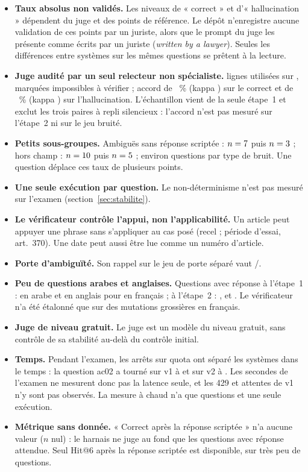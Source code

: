 \begin{itemize}
  \item \textbf{Taux absolus non validés.} Les niveaux de « correct » et d'« hallucination » dépendent du juge et des points de référence.
        Le dépôt n'enregistre aucune validation de ces points par un juriste, alors que le prompt du juge les présente comme écrits par
        un juriste (\emph{written by a lawyer}). Seules les différences entre systèmes sur les mêmes questions se prêtent à la lecture.
  \item \textbf{Juge audité par un seul relecteur non spécialiste.} \EvAuditUsed{} lignes utilisées sur \EvAuditRows, \EvAuditCannot{} marquées
        impossibles à vérifier ; accord de \EvAuditCorrectAgree~\% (kappa \EvAuditCorrectKappa) sur le correct et de \EvAuditHallucAgree~\% (kappa
        \EvAuditHallucKappa) sur l'hallucination. L'échantillon vient de la seule étape~1 et exclut les trois paires à repli silencieux : l'accord
        n'est pas mesuré sur l'étape~2 ni sur le jeu bruité.
  \item \textbf{Petits sous-groupes.} Ambiguës sans réponse scriptée : $n=7$ puis $n=3$ ; hors champ :
        $n=10$ puis $n=5$ ; environ \EvGroupTyposN{} questions par type de bruit. Une question déplace ces taux de
        plusieurs points.
  \item \textbf{Une seule exécution par question.} Le non-déterminisme n'est pas mesuré sur l'examen (section~\ref{sec:stabilite}).
  \item \textbf{Le vérificateur contrôle l'appui, non l'applicabilité.} Un article peut appuyer une phrase sans s'appliquer au cas posé
        (recel ; période d'essai, art.~370). Une date peut aussi être lue comme un numéro d'article.
  \item \textbf{Porte d'ambiguïté.} Son rappel sur le jeu de porte séparé vaut \EvGateRecall/\EvGateRecallN.
  \item \textbf{Peu de questions arabes et anglaises.} Questions avec réponse à l'étape~1 : \EvSoneAr{} en arabe et \EvSoneEn{} en anglais pour
        \EvSoneFr{} en français ; à l'étape~2 : \EvStwoAr, \EvStwoEn{} et \EvStwoFr. Le vérificateur n'a été étalonné que sur des mutations
        grossières en français.
  \item \textbf{Juge de niveau gratuit.} Le juge est un modèle du niveau gratuit, sans contrôle de sa stabilité au-delà du contrôle initial.
  \item \textbf{Temps.} Pendant l'examen, les arrêts sur quota ont séparé les systèmes dans le temps : la question ac02 a tourné sur v1 à
        \EvFirstAcZeroTwoVone{} et sur v2 à \EvFirstAcZeroTwoVtwo. Les secondes de l'examen ne mesurent donc pas la latence seule, et les 429 et attentes de
        v1 n'y sont pas observés. La mesure à chaud n'a que \EvLatQuestions{} questions et une seule exécution.
  \item \textbf{Métrique sans donnée.} « Correct après la réponse scriptée » n'a aucune valeur ($n$ nul) : le harnais ne juge au fond que les
        questions avec réponse attendue. Seul Hit@6 après la réponse scriptée est disponible, sur très peu de questions.
\end{itemize}

